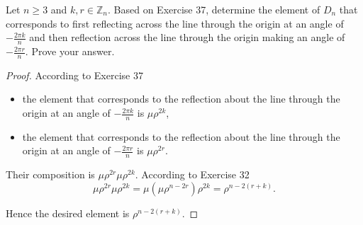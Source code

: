 \begin{exercise}
    Let $n\geq 3$ and $k, r\in\mathbb{Z}_{n}$. Based on Exercise 37, determine the element of $D_{n}$ that corresponds to first reflecting across the line through the origin at an angle of $-\frac{2\pi k}{n}$ and then reflection across the line through the origin making an angle of $-\frac{2\pi r}{n}$. Prove your answer.
\end{exercise}

\begin{proof}
    According to Exercise 37
    \begin{itemize}
        \item the element that corresponds to the reflection about the line through the origin at an angle of $-\frac{2\pi k}{n}$ is $\mu\rho^{2k}$,
        \item the element that corresponds to the reflection about the line through the origin at an angle of $-\frac{2\pi r}{n}$ is $\mu\rho^{2r}$.
    \end{itemize}

    Their composition is $\mu\rho^{2r}\mu\rho^{2k}$. According to Exercise 32
    \[
        \mu\rho^{2r}\mu\rho^{2k} = \mu(\mu\rho^{n-2r})\rho^{2k} = \rho^{n-2(r+k)}.
    \]

    Hence the desired element is $\rho^{n-2(r+k)}$.
\end{proof}







